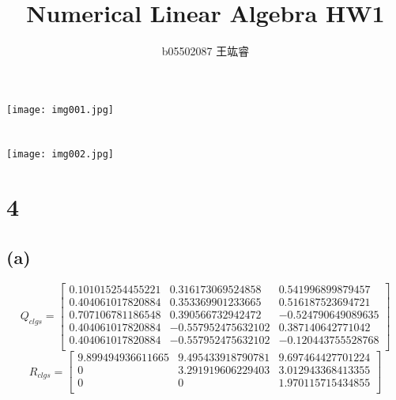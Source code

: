 \documentclass{article}
\title{Numerical Linear Algebra HW1}
\date{}
\author{b05502087 王竑睿}
\begin{document}
    \maketitle
    \section*{}
    \texttt{[image: img001.jpg]}
    \section*{}
    \texttt{[image: img002.jpg]}
    \newpage
    \section*{4}
        \subsection*{(a)}
            \begin{equation*}
                Q_{clgs} = \left[
                \begin{array}{ccc}
                    0.101015254455221 &  0.316173069524858 &  0.541996899879457\\
                    0.404061017820884 &  0.353369901233665 &  0.516187523694721\\
                    0.707106781186548 &  0.390566732942472 & -0.524790649089635\\
                    0.404061017820884 & -0.557952475632102 &  0.387140642771042\\
                    0.404061017820884 & -0.557952475632102 & -0.120443755528768\\
                \end{array}
                \right]
            \end{equation*}
            \begin{equation*}
                R_{clgs} = \left[    
                \begin{array}{ccc}
                    9.899494936611665 &  9.495433918790781 &  9.697464427701224\\
                    0 &  3.291919606229403 &  3.012943368413355\\
                    0 &                  0 &  1.970115715434855\\
                \end{array}
                \right]
            \end{equation*}
\end{document}
